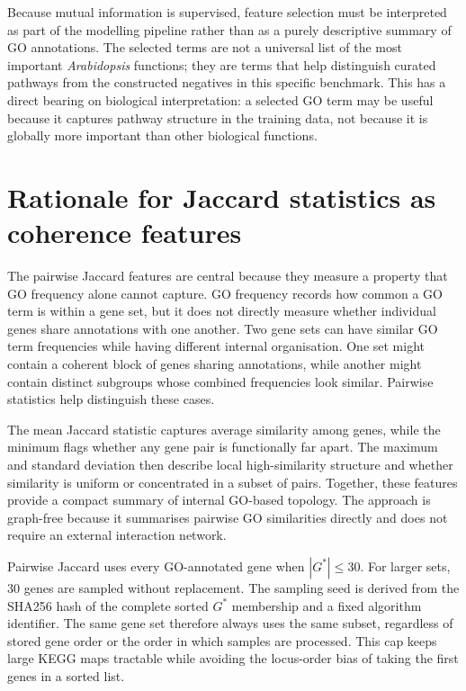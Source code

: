 \documentclass[12pt,letterpaper,oneside,openany]{book}
\begin{document}
Because mutual information is supervised, feature selection must be interpreted as part of the modelling pipeline rather than as a purely descriptive summary of GO annotations. The selected terms are not a universal list of the most important \textit{Arabidopsis} functions; they are terms that help distinguish curated pathways from the constructed negatives in this specific benchmark. This has a direct bearing on biological interpretation: a selected GO term may be useful because it captures pathway structure in the training data, not because it is globally more important than other biological functions.

\section{Rationale for Jaccard statistics as coherence features}
\label{sec:methods_jaccard_rationale}

The pairwise Jaccard features are central because they measure a property that GO frequency alone cannot capture. GO frequency records how common a GO term is within a gene set, but it does not directly measure whether individual genes share annotations with one another. Two gene sets can have similar GO term frequencies while having different internal organisation. One set might contain a coherent block of genes sharing annotations, while another might contain distinct subgroups whose combined frequencies look similar. Pairwise statistics help distinguish these cases.

The mean Jaccard statistic captures average similarity among genes, while the minimum flags whether any gene pair is functionally far apart. The maximum and standard deviation then describe local high-similarity structure and whether similarity is uniform or concentrated in a subset of pairs. Together, these features provide a compact summary of internal GO-based topology. The approach is graph-free because it summarises pairwise GO similarities directly and does not require an external interaction network.

Pairwise Jaccard uses every GO-annotated gene when $|G^*|\leq30$. For larger sets, 30 genes are sampled without replacement. The sampling seed is derived from the SHA256 hash of the complete sorted $G^*$ membership and a fixed algorithm identifier. The same gene set therefore always uses the same subset, regardless of stored gene order or the order in which samples are processed. This cap keeps large KEGG maps tractable while avoiding the locus-order bias of taking the first genes in a sorted list.
\end{document}
